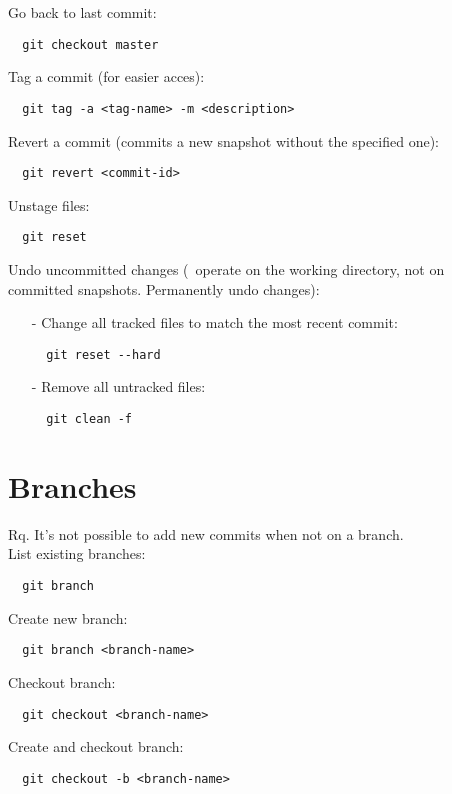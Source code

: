 \documentclass[french]{article}
\begin{document}
Go back to last commit:
\begin{verbatim}
  git checkout master
\end{verbatim}

Tag a commit (for easier acces):
\begin{verbatim}
  git tag -a <tag-name> -m <description>
\end{verbatim}

Revert a commit (commits a new snapshot without the specified one):
\begin{verbatim}
  git revert <commit-id>
\end{verbatim}

Unstage files:
\begin{verbatim}
  git reset
\end{verbatim}

Undo uncommitted changes (\danger\ operate on the working directory, not on committed snapshots. Permanently undo changes):
\begin{itemize}
\item [-] Change all tracked files to match the most recent commit:
\begin{verbatim}
  git reset --hard
\end{verbatim}
\item [-] Remove all untracked files:
\begin{verbatim}
  git clean -f
\end{verbatim}
\end{itemize}

\section{Branches}

Rq. It's not possible to add new commits when not on a branch.\\

List existing branches:
\begin{verbatim}
  git branch
\end{verbatim}

Create new branch:
\begin{verbatim}
  git branch <branch-name>
\end{verbatim}

Checkout branch:
\begin{verbatim}
  git checkout <branch-name>
\end{verbatim}

Create and checkout branch:
\begin{verbatim}
  git checkout -b <branch-name>
\end{verbatim}
\end{document}
